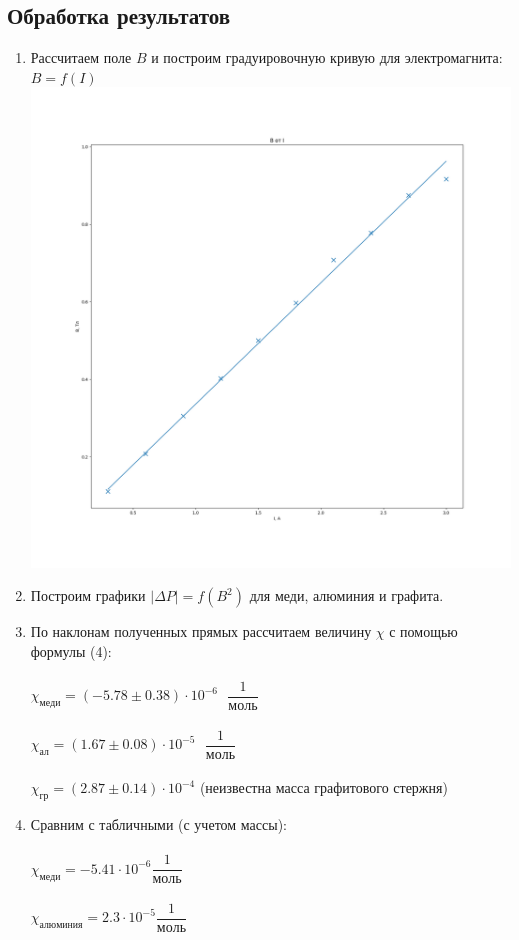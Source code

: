 \documentclass[a4paper, 12pt]{article}
\newcommand{\mysec}[1]{\begin{center}\section*{#1}\end{center}}
\begin{document}
\mysec{Обработка результатов}
\begin{enumerate}
    \item Рассчитаем поле $B$ и построим градуировочную кривую для электромагнита: $B = f \left( I \right)$
    \\
    \includegraphics[width=\linewidth]{graph1.png}

    \item Построим графики $|\Delta P| = f(B^2)$ для меди, алюминия и графита.
    
    \item По наклонам полученных прямых рассчитаем величину $\chi$ с помощью формулы (4):
    \\\\
    $\chi_{меди} = (-5.78 \pm 0.38) \cdot 10^{-6} \text{ } \dfrac{1}{моль}$ 
    \\\\
    $\chi_{ал} = (1.67 \pm 0.08) \cdot 10^{-5} \text{ } \dfrac{1}{моль}$
    \\\\
    $\chi_{гр} = (2.87 \pm 0.14) \cdot 10^{-4}$ (неизвестна масса графитового стержня)

    \item Сравним с табличными (с учетом массы): 
    \\\\
    $\chi_{меди} = -5.41 \cdot 10^{-6} \dfrac{1}{моль}$
    \\\\
    $\chi_{алюминия} = 2.3 \cdot 10^{-5} \dfrac{1}{моль}$


\end{enumerate}
\end{document}
